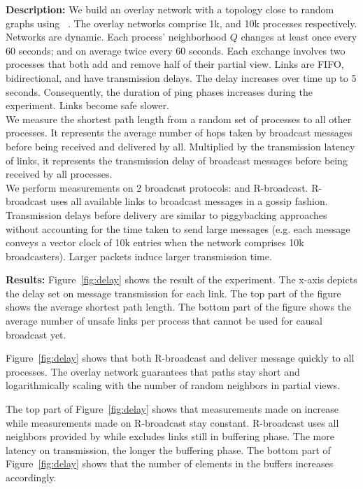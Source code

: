 \noindent \textbf{Description:} We build an overlay network with a topology
close to random graphs using \SPRAY~\cite{nedelec2017adaptive}. The overlay
networks comprise 1k, and 10k processes respectively. Networks are dynamic. Each
process' neighborhood $Q$ changes at least once every 60 seconds; and on average
twice every 60 seconds. Each exchange involves two processes that both add and
remove half of their partial view.  Links are FIFO, bidirectional, and have
transmission delays. The delay increases over time up to 5 seconds.
Consequently, the duration of ping phases increases during the experiment.
Links become safe slower. \\
We measure the shortest path length from a random set of processes to all other
processes. It represents the average number of hops taken by broadcast messages
before being received and delivered by all.  Multiplied by the transmission
latency of links, it represents the transmission delay of broadcast
messages before being received by all processes. \\
We perform measurements on 2 broadcast protocols: \CBROADCAST and R-broadcast.
R-broadcast uses all available links to broadcast messages in a gossip fashion.
Transmission delays before delivery are similar to piggybacking
approaches~\cite{almeida2008interval,fidge1988timestamps,mattern1989virtual,singhal1992efficient}~\cite{birman1987reliable,hadzilacos1993fault,mostefaoui2017probabilistic}
without accounting for the time taken to send large messages (e.g. each message
conveys a vector clock of 10k entries when the network comprises 10k broadcasters).
Larger packets induce larger transmission time.

\noindent \textbf{Results:} Figure~\ref{fig:delay} shows the result of the
experiment. The x-axis depicts the delay set on message transmission for each
link. The top part of the figure shows the average shortest path length. The
bottom part of the figure shows the average number of unsafe links per process
that cannot be used for causal broadcast yet.

\noindent Figure~\ref{fig:delay} shows that both R-broadcast and \CBROADCAST deliver
  message quickly to all processes. The overlay network guarantees that paths
  stay short and logarithmically scaling with the number of random neighbors in
  partial views.

\noindent The top part of Figure~\ref{fig:delay} shows that measurements made on
  \CBROADCAST increase while measurements made on R-broadcast stay
  constant. R-broadcast uses all neighbors provided by \SPRAY while \CBROADCAST
  excludes links still in buffering phase. The more latency on transmission, the
  longer the buffering phase. The bottom part of Figure~\ref{fig:delay} shows
  that the number of elements in the buffers increases accordingly.

